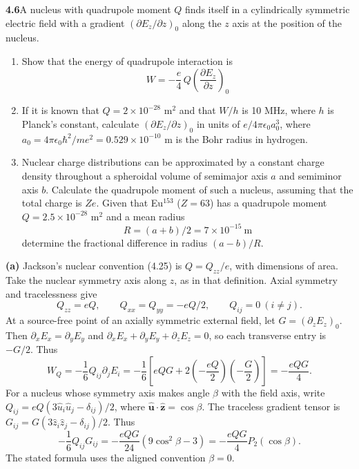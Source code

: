 \par\bigskip
\noindent\textbf{4.6}\quad A nucleus with quadrupole moment $Q$ finds itself in a cylindrically symmetric electric field with a gradient $(\partial E_{z}/\partial z)_{0}$ along the $z$ axis at the position of the nucleus. 
\begin{enumerate}
\item[(a)] Show that the energy of quadrupole interaction is
\[
W=-\frac{e}{4}\,Q\left(\frac{\partial E_{z}}{\partial z}\right)_{0}
\]
\item[(b)] If it is known that $Q=2\times10^{-28}$ m$^{2}$ and that $W/h$ is 10 MHz, where $h$ is Planck's constant, calculate $(\partial E_{z}/\partial z)_{0}$ in units of $e/4\pi\epsilon_{0}a_{0}^{3}$, where $a_{0}=4\pi\epsilon_{0}\hbar^{2}/me^{2}=0.529\times10^{-10}$ m is the Bohr radius in hydrogen.
\item[(c)] Nuclear charge distributions can be approximated by a constant charge density throughout a spheroidal volume of semimajor axis $a$ and semiminor axis $b$. Calculate the quadrupole moment of such a nucleus, assuming that the total charge is $Ze$. Given that Eu$^{153}$ ($Z=63$) has a quadrupole moment $Q=2.5\times10^{-28}$ m$^{2}$ and a mean radius
\[
R=(a+b)/2=7\times10^{-15}\ \mathrm{m}
\]
determine the fractional difference in radius $(a-b)/R$.
\end{enumerate}
\solution

\textbf{(a)} Jackson's nuclear convention (4.25) is
$Q=Q_{zz}/e$, with dimensions of area. Take the nuclear symmetry axis
along $z$, as in that definition. Axial symmetry and tracelessness give
\[
Q_{zz}=eQ,\qquad Q_{xx}=Q_{yy}=-eQ/2,\qquad Q_{ij}=0\ (i\ne j).
\]
At a source-free point of an axially symmetric external field, let
$G=(\partial_zE_z)_0$. Then
$\partial_xE_x=\partial_yE_y$ and
$\partial_xE_x+\partial_yE_y+\partial_zE_z=0$, so each transverse
entry is $-G/2$. Thus
\[
W_Q=-\frac16 Q_{ij}\partial_jE_i
=-\frac16\left[eQG+2\left(-\frac{eQ}{2}\right)
\left(-\frac G2\right)\right]
=\boxed{-\frac{eQG}{4}}.
\]
For a nucleus whose symmetry axis makes angle $\beta$ with the field
axis, write $Q_{ij}=eQ(3\widehat u_i\widehat u_j-\delta_{ij})/2$,
where $\widehat{\mathbf u}\cdot\widehat{\mathbf z}=\cos\beta$.
The traceless gradient tensor is
$G_{ij}=G(3\widehat z_i\widehat z_j-\delta_{ij})/2$. Thus
\[
-\frac16Q_{ij}G_{ij}
=-\frac{eQG}{24}(9\cos^2\beta-3)
=-\frac{eQG}{4}P_2(\cos\beta).
\]
The stated formula uses the aligned convention $\beta=0$.

